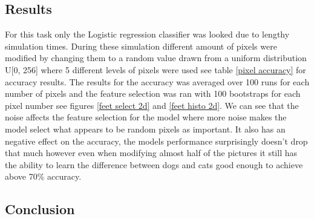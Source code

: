 \documentclass{article}
\begin{document}
\subsection{Results}
For this task only the Logistic regression classifier was looked due to lengthy simulation times. During these simulation different amount of pixels were modified by changing them to a random value drawn from a uniform distribution U[0, 256] where 5 different levels of pixels were used see table \ref{pixel accuracy} for accuracy results. The results for the accuracy was averaged over 100 runs for each number of pixels and the feature selection was ran with 100 bootstraps for each pixel number see figures \ref{feet select 2d} and \ref{feet histo 2d}. We can see that the noise affects the feature selection for the model where more noise makes the model select what appears to be random pixels as important. It also has an negative effect on the accuracy, the models performance surprisingly doesn't drop that much however even when modifying almost half of the pictures it still has the ability to learn the difference between dogs and cats good enough to achieve above 70\% accuracy.
\subsection{Conclusion}
\end{document}
